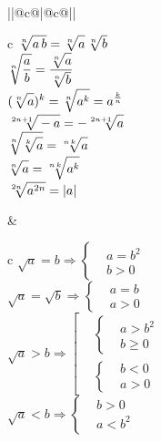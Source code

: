 \begin{tabu}[t]{||@{}c@{}|@{}c@{}||}
	\hline
		 \\
	\hline
		\begin{tabu}[t]{c}
				$\displaystyle \sqrt[n]{\mathstrut a\, b} = \sqrt[n]{\mathstrut a} \, \sqrt[n]{\mathstrut b} $ \\
			\hline
				$\displaystyle \sqrt[n]{\mathstrut \frac{a}{b}} = \frac{\sqrt[n]{\mathstrut a}}{\sqrt[n]{\mathstrut b}} $ \\
			\hline
				$\displaystyle (\sqrt[n]{\mathstrut a})^k = \sqrt[n]{\mathstrut a^k} = a^{\frac{k}{n}} $ \\
			\hline
				$\displaystyle \sqrt[2n + 1]{\mathstrut -a} = -\sqrt[2n + 1]{\mathstrut a} $ \\
			\hline
				$\displaystyle \sqrt[n]{\mathstrut \sqrt[k]{\mathstrut a}} = \sqrt[n\, k]{\mathstrut a} $ \\
			\hline
				$\displaystyle \sqrt[n]{\mathstrut a} = \sqrt[n\, k]{\mathstrut a^k} $ \\
			\hline
				$\displaystyle \sqrt[2n]{\mathstrut a^{2n}} = |a| $ \\
		\end{tabu} &
		\begin{tabu}[t]{c}
				$\displaystyle \sqrt{a} = b \Rightarrow  \left\{ \begin{aligned}
					& a = b^2 \\
					& b > 0
				\end{aligned}\right. $ \\
			\hline
				$\displaystyle \sqrt{a} = \sqrt{b} \Rightarrow  \left\{ \begin{aligned}
					& a = b \\
					& a > 0
				\end{aligned}\right. $ \\
			\hline
				$\displaystyle \sqrt{a} > b \Rightarrow  \left[ \begin{aligned}
					& \left\{ \begin{aligned}
						& a > b^2 \\
						& b \geqslant 0
					\end{aligned} \right. \\
					& \left\{ \begin{aligned}
						& b < 0 \\
						& a > 0
					\end{aligned} \right.
				\end{aligned} \right. $ \\
			\hline
				$\displaystyle \sqrt{a} < b \Rightarrow \left\{ \begin{aligned}
						& b > 0 \\
						& a < b^2
					\end{aligned} \right. $ \\
		\end{tabu} \\
	\hline
\end{tabu}
